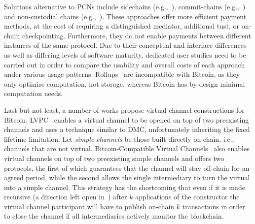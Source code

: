   Solutions alternative to PCNs include side\-chains
  (e.g.,~\cite{BCDF+14,sidechains,KiaZin18}), commit-chains
  (e.g.,~\cite{plasma}) and non-cu\-sto\-di\-al chains
  (e.g.,~\cite{plasma,konstantopoulos2019plasma,plasma-lower-bounds}). These
  approaches offer more efficient payment methods, at the cost of
  requiring a distinguished mediator, additional tust, or on-chain
  checkpointing. Furthermore, they do not enable payments between different instances
  of the same protocol. Due to their conceptual and interface differences as
  well as differing levels of software maturity, dedicated user studies need to
  be carried out in order to compare the usability and overall costs of each
  approach under various usage patterns. Rollups~\cite{ZKRollup,Optimism} are
  incompatible with Bitcoin, as they only optimise computation, not storage,
  whereas Bitcoin has by design minimal computation needs.

  Last but not least, a number of works propose virtual channel constructions
  for Bitcoin. LVPC~\cite{10.1007/978-3-030-65411-5_18} enables a virtual channel to be
  opened on top of two preexisting channels and uses a technique similar to DMC,
  unfortunately inheriting the fixed lifetime limitation.
  Let \emph{simple channels} be those built directly on-chain, i.e., channels that are not
  virtual.
  Bitcoin-Compatible Virtual Channels~\cite{9519487} also enables
  virtual channels on top of two preexisting simple channels
  and offers two protocols, the first of which guarantees that the channel will
  stay off-chain for an agreed period, while the second allows the single intermediary
  to turn the virtual into a simple channel.
  This strategy has the shortcoming that even if it is made
  recursive (a direction left open in~\cite{9519487}) after $k$
  applications of the constructor the virtual channel participant will have to
  publish on-chain $k$ transactions in order to close the channel if all
  intermediaries actively monitor the blockchain.

